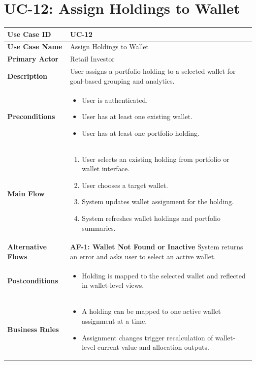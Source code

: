 \section{UC-12: Assign Holdings to Wallet}
\label{uc:assign-wallet}

\begin{longtable}{|>{\raggedright\arraybackslash\bfseries}p{3.5cm}|p{11cm}|}
\hline
\rowcolor{gray!15} Use Case ID & UC-12 \\ \hline
Use Case Name & Assign Holdings to Wallet \\ \hline
Primary Actor & Retail Investor \\ \hline
Description & User assigns a portfolio holding to a selected wallet for goal-based grouping and analytics. \\ \hline
Preconditions &
\begin{itemize}[leftmargin=*, nosep]
    \item User is authenticated.
    \item User has at least one existing wallet.
    \item User has at least one portfolio holding.
\end{itemize} \\ \hline
Main Flow &
\begin{enumerate}[leftmargin=*, nosep]
    \item User selects an existing holding from portfolio or wallet interface.
    \item User chooses a target wallet.
    \item System updates wallet assignment for the holding.
    \item System refreshes wallet holdings and portfolio summaries.
\end{enumerate} \\ \hline
Alternative Flows &
\textbf{AF-1: Wallet Not Found or Inactive} \newline
System returns an error and asks user to select an active wallet. \\ \hline
Postconditions &
\begin{itemize}[leftmargin=*, nosep]
    \item Holding is mapped to the selected wallet and reflected in wallet-level views.
\end{itemize} \\ \hline
Business Rules &
\begin{itemize}[leftmargin=*, nosep]
    \item A holding can be mapped to one active wallet assignment at a time.
    \item Assignment changes trigger recalculation of wallet-level current value and allocation outputs.
\end{itemize} \\ \hline
\end{longtable}


